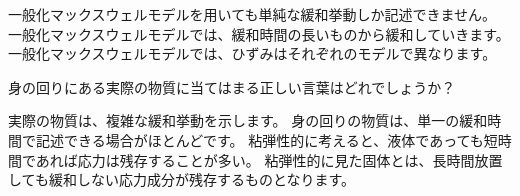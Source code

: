 \documentclass[uplatex,dvipdfmx,a4paper,11pt]{jsreport}
\begin{document}
\begin{qlist}
\begin{qlist2}
			\qitem 一般化マックスウェルモデルを用いても単純な緩和挙動しか記述できません。
			\qitem 一般化マックスウェルモデルでは、緩和時間の長いものから緩和していきます。
			\qitem 一般化マックスウェルモデルでは、ひずみはそれぞれのモデルで異なります。
		\end{qlist2}
	\qitem 身の回りにある実際の物質に当てはまる正しい言葉はどれでしょうか？
		\begin{qlist2}
			\qitem 実際の物質は、複雑な緩和挙動を示します。
			\qitem 身の回りの物質は、単一の緩和時間で記述できる場合がほとんどです。
			\qitem 粘弾性的に考えると、液体であっても短時間であれば応力は残存することが多い。
			\qitem 粘弾性的に見た固体とは、長時間放置しても緩和しない応力成分が残存するものとなります。
		\end{qlist2}
\end{qlist}
\end{document}
